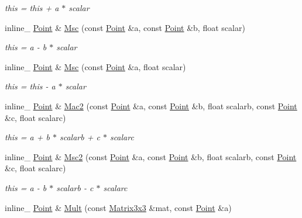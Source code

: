 \begin{DoxyCompactItemize}
\begin{DoxyCompactList}\small\item\em this = this + a $\ast$ scalar \end{DoxyCompactList}\item 
\hypertarget{class_point_a158adf82aa3957050f2cc51b8dd84cf2}{inline\+\_\+ \hyperlink{class_point}{Point} \& \hyperlink{class_point_a158adf82aa3957050f2cc51b8dd84cf2}{Msc} (const \hyperlink{class_point}{Point} \&a, const \hyperlink{class_point}{Point} \&b, float scalar)}\label{class_point_a158adf82aa3957050f2cc51b8dd84cf2}

\begin{DoxyCompactList}\small\item\em this = a -\/ b $\ast$ scalar \end{DoxyCompactList}\item 
\hypertarget{class_point_aaf6db3642124908e9e01f10612b1b7d6}{inline\+\_\+ \hyperlink{class_point}{Point} \& \hyperlink{class_point_aaf6db3642124908e9e01f10612b1b7d6}{Msc} (const \hyperlink{class_point}{Point} \&a, float scalar)}\label{class_point_aaf6db3642124908e9e01f10612b1b7d6}

\begin{DoxyCompactList}\small\item\em this = this -\/ a $\ast$ scalar \end{DoxyCompactList}\item 
\hypertarget{class_point_ac60c49b6912aa0ca87c914a253ef45d5}{inline\+\_\+ \hyperlink{class_point}{Point} \& \hyperlink{class_point_ac60c49b6912aa0ca87c914a253ef45d5}{Mac2} (const \hyperlink{class_point}{Point} \&a, const \hyperlink{class_point}{Point} \&b, float scalarb, const \hyperlink{class_point}{Point} \&c, float scalarc)}\label{class_point_ac60c49b6912aa0ca87c914a253ef45d5}

\begin{DoxyCompactList}\small\item\em this = a + b $\ast$ scalarb + c $\ast$ scalarc \end{DoxyCompactList}\item 
\hypertarget{class_point_a2ee343e02b3298ec343c6c8ac2909f3e}{inline\+\_\+ \hyperlink{class_point}{Point} \& \hyperlink{class_point_a2ee343e02b3298ec343c6c8ac2909f3e}{Msc2} (const \hyperlink{class_point}{Point} \&a, const \hyperlink{class_point}{Point} \&b, float scalarb, const \hyperlink{class_point}{Point} \&c, float scalarc)}\label{class_point_a2ee343e02b3298ec343c6c8ac2909f3e}

\begin{DoxyCompactList}\small\item\em this = a -\/ b $\ast$ scalarb -\/ c $\ast$ scalarc \end{DoxyCompactList}\item 
\hypertarget{class_point_a15dbdfc1415414ffc5fdb4d1892ebacc}{inline\+\_\+ \hyperlink{class_point}{Point} \& \hyperlink{class_point_a15dbdfc1415414ffc5fdb4d1892ebacc}{Mult} (const \hyperlink{class_matrix3x3}{Matrix3x3} \&mat, const \hyperlink{class_point}{Point} \&a)}\label{class_point_a15dbdfc1415414ffc5fdb4d1892ebacc}


\end{DoxyCompactItemize}
